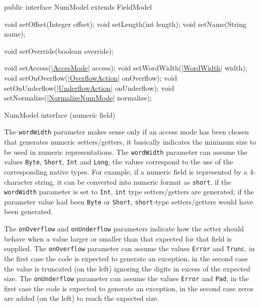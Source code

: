 \begin{elisting}[!htb]
\begin{javacode}
public interface NumModel extends FieldModel {
    void setOffset(Integer offset);
    void setLength(int length);
    void setName(String name);

    void setOverride(boolean override);

    void setAccess(|\hyperref[lst:AccesMode]{AccesMode}| access);
    void setWordWidth(|\hyperref[lst:WordWidth]{WordWidth}| width);
    void setOnOverflow(|\hyperref[lst:OverflowAction]{OverflowAction}| onOverflow);
    void setOnUnderflow(|\hyperref[lst:UnderflowAction]{UnderflowAction}| onUnderflow);
    void setNormalize(|\hyperref[lst:NormalizeNumMode]{NormalizeNumMode}| normalize);
}
\end{javacode}
\caption{NumModel interface (numeric field)}
\label{lst:NumModel}
\end{elisting}

The \verb!wordWidth! parameter makes sense only if an access mode has been 
chosen that generates numeric setters/getters, it basically indicates the 
minimum size to be used in numeric representations. 
The \verb!wordWidth! parameter can assume the values \verb!Byte!, \verb!Short!, 
\verb!Int! and \verb!Long!, the values correspond to the use of the 
corresponding native types. 
For example, if a numeric field is represented by a 4-character string, it can 
be converted into numeric format as \verb!short!, if the \verb!wordWidth! 
parameter is set to \verb!Int!, \verb!int! type setters/getters are generated; 
if the parameter value had been \verb!Byte! or \verb!Short!, \verb!short!-type 
setters/getters would have been generated.

The \verb!onOverflow! and \verb!onUnderflow! parameters indicate how the setter 
should behave when a value larger or smaller than that expected for that field 
is supplied. 
The \verb!onOverflow! parameter can assume the values \verb!Error! and 
\verb!Trunc!, in the first case the code is expected to generate an exception, 
in the second case the value is truncated (on the left) ignoring the digits in 
excess of the expected size. 
The \verb!onUnderflow! parameter can assume the values \verb!Error! and 
\verb!Pad!, in the first case the code is expected to generate an exception, in 
the second case zeros are added (on the left) to reach the expected size.

